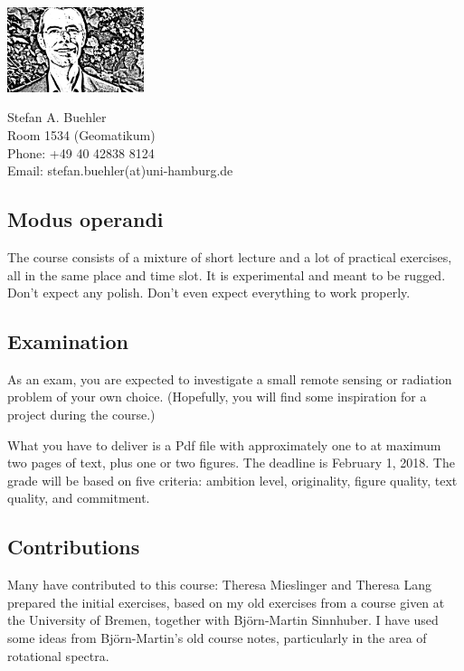 \includegraphics[width=4cm]{figures/buehler_portrait_sketch}
~
\begin{minipage}{0.5\linewidth}
  \vspace*{-1.6cm}
  Stefan A. Buehler\\
  Room 1534 (Geomatikum)\\
  Phone: +49 40 42838 8124\\
  Email: stefan.buehler(at)uni-hamburg.de\\
\end{minipage}

\subsection*{Modus operandi}

The course consists of a mixture of short lecture and a lot of
practical exercises, all in the same place and time slot. It is
experimental and meant to be rugged. Don’t expect any polish. Don’t
even expect everything to work properly.

\subsection*{Examination}

As an exam, you are expected to investigate a small remote sensing or
radiation problem of your own choice. (Hopefully, you will find some
inspiration for a project during the course.)

What you have to deliver is a Pdf file with approximately one to at
maximum two pages of text, plus one or two figures. The deadline is
February 1, 2018. The grade will be based on five criteria: ambition
level, originality, figure quality, text quality, and commitment.

\subsection*{Contributions}

Many have contributed to this course: Theresa Mieslinger and Theresa
Lang prepared the initial exercises, based on my old exercises from a
course given at the University of Bremen, together with Björn-Martin
Sinnhuber. I have used some ideas from Björn-Martin's old course
notes, particularly in the area of rotational spectra.

